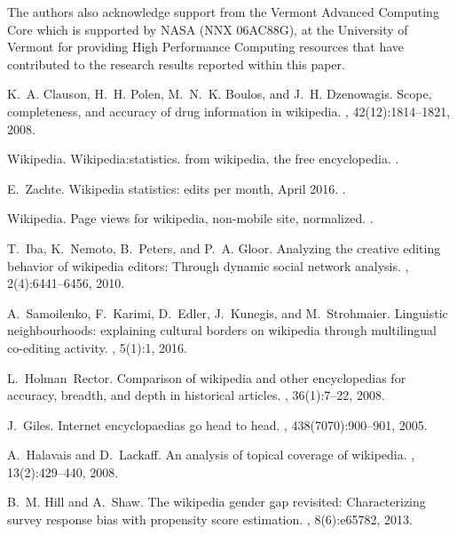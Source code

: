 \documentclass[pre,twocolumn,twoside,superscriptaddress,floatfix]{revtex4-1}
\begin{document}
{The authors also acknowledge support from the Vermont Advanced Computing Core which is supported by NASA (NNX 06AC88G), at the University of Vermont for providing High Performance Computing resources that have contributed to the research results reported within this paper.

\begin{thebibliography}{10}

K.~A. Clauson, H.~H. Polen, M.~N.~K. Boulos, and J.~H. Dzenowagis.
\newblock Scope, completeness, and accuracy of drug information in wikipedia.
, 42(12):1814--1821, 2008.

Wikipedia.
\newblock Wikipedia:statistics. from wikipedia, the free encyclopedia.
.

E.~Zachte.
\newblock Wikipedia statistics: edits per month, April 2016.
.

Wikipedia.
\newblock Page views for wikipedia, non-mobile site, normalized.
.

T.~Iba, K.~Nemoto, B.~Peters, and P.~A. Gloor.
\newblock Analyzing the creative editing behavior of wikipedia editors: Through
  dynamic social network analysis.
, 2(4):6441--6456, 2010.

A.~Samoilenko, F.~Karimi, D.~Edler, J.~Kunegis, and M.~Strohmaier.
\newblock Linguistic neighbourhoods: explaining cultural borders on wikipedia
  through multilingual co-editing activity.
, 5(1):1, 2016.

L.~Holman~Rector.
\newblock Comparison of wikipedia and other encyclopedias for accuracy,
  breadth, and depth in historical articles.
, 36(1):7--22, 2008.

J.~Giles.
\newblock Internet encyclopaedias go head to head.
, 438(7070):900--901, 2005.

A.~Halavais and D.~Lackaff.
\newblock An analysis of topical coverage of wikipedia.
, 13(2):429--440,
  2008.

B.~M. Hill and A.~Shaw.
\newblock The wikipedia gender gap revisited: Characterizing survey response
  bias with propensity score estimation.
, 8(6):e65782, 2013.


\end{thebibliography}}
\end{document}
